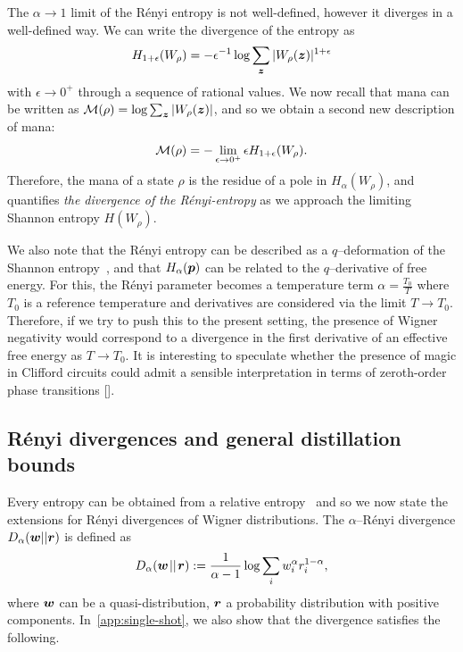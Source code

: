 \documentclass[pra,
aps,
twocolumn,
superscriptaddress,
groupedaddress,
nofootinbib,
reprint
]{revtex4-1}
\begin{document}
The $\alpha \rightarrow 1$ limit of the R\'{e}nyi entropy is not well-defined, however it diverges in a well-defined way. We can write the divergence of the entropy as 
\begin{equation}
	H_{1+\epsilon}(W_\rho) = -\epsilon^{-1} \log \sum_{\bm{z}} |W_\rho (\bm{z})|^{1+\epsilon}
\end{equation} 
with $\epsilon \rightarrow 0^+$ through a sequence of rational values. We now recall that mana can be written as ${\mathcal M}(\rho) = \log \sum_{\bm{z}} |W_\rho(\bm{z})|$, and so we obtain a second new description of mana:
\begin{equation}\label{eq:mana-divergence}
{\mathcal M}(\rho) = -\lim_{\epsilon \rightarrow 0^+} \epsilon H_{1+\epsilon}(W_\rho).
\end{equation}
Therefore, the mana of a state $\rho$ is the residue of a pole in $H_\alpha(W_\rho)$, and quantifies \emph{the divergence of the R\'{e}nyi-entropy} as we approach the limiting Shannon entropy $H(W_\rho)$. 

We also note that the R\'{e}nyi entropy can be described as a $q$--deformation of the Shannon entropy~\cite{baez2011renyi}, and that $H_\alpha(\boldsymbol{p})$ can be related to the $q$--derivative of free energy.  For this, the R\'{e}nyi parameter becomes a temperature term $\alpha = \frac{T_0}{T}$ where $T_0$ is a reference temperature and derivatives are considered via the limit $T \rightarrow T_0$. Therefore, if we try to push this to the present setting, the presence of Wigner negativity would correspond to a divergence in the first derivative of an effective free energy as $T \rightarrow T_0$. It is interesting to speculate whether the presence of magic in Clifford circuits could admit a sensible interpretation in terms of zeroth-order phase transitions [].

\subsection{R\'{e}nyi divergences and general distillation bounds}
Every entropy can be obtained from a relative entropy~\cite{Gour_2020} and so we now state the extensions for R\'{e}nyi divergences of Wigner distributions.
The $\alpha$--R\'{e}nyi divergence $D_\alpha(\boldsymbol{w}||\boldsymbol{r})$ is defined as
\begin{equation}
	D_\alpha(\boldsymbol{w} \hspace{1pt}||\hspace{1pt} \boldsymbol{r}) := \frac{1}{\alpha-1} \log \sum_i w_i^\alpha r_i^{1-\alpha},
\end{equation}
where $\boldsymbol{w}$ can be a quasi-distribution, $\boldsymbol{r}$ a probability distribution with positive components. In~\cref{app:single-shot}, we also show that the divergence satisfies the following.
\end{document}

